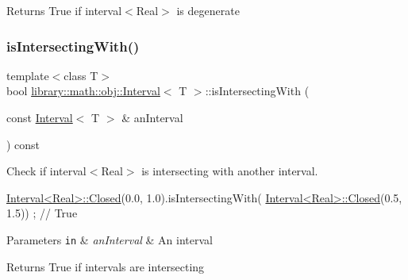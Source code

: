 \begin{DoxyReturn}{Returns}
True if interval$<$\+Real$>$ is degenerate 
\end{DoxyReturn}
\mbox{\label{classlibrary_1_1math_1_1obj_1_1_interval_a5c02f1b4c3a6913a2eb0893d5c3b9925}} 
\subsubsection{\texorpdfstring{is\+Intersecting\+With()}{isIntersectingWith()}}
{\footnotesize\ttfamily template$<$class T$>$ \\
bool \hyperlink{classlibrary_1_1math_1_1obj_1_1_interval}{library\+::math\+::obj\+::\+Interval}$<$ T $>$\+::is\+Intersecting\+With (\begin{DoxyParamCaption}\item[{const \hyperlink{classlibrary_1_1math_1_1obj_1_1_interval}{Interval}$<$ T $>$ \&}]{an\+Interval }\end{DoxyParamCaption}) const}



Check if interval$<$\+Real$>$ is intersecting with another interval. 


\begin{DoxyCode}
\hyperlink{classlibrary_1_1math_1_1obj_1_1_interval_aae8bb2b89af450729338d48563def4d7}{Interval<Real>::Closed}(0.0, 1.0).isIntersectingWith(
      \hyperlink{classlibrary_1_1math_1_1obj_1_1_interval_aae8bb2b89af450729338d48563def4d7}{Interval<Real>::Closed}(0.5, 1.5)) ; \textcolor{comment}{// True}
\end{DoxyCode}



\begin{DoxyParams}[1]{Parameters}
\mbox{\tt in}  & {\em an\+Interval} & An interval \\
\hline
\end{DoxyParams}
\begin{DoxyReturn}{Returns}
True if intervals are intersecting 
\end{DoxyReturn}
\mbox{\label{classlibrary_1_1math_1_1obj_1_1_interval_add0e1114a0c153da7a928fd059a08919}} 

